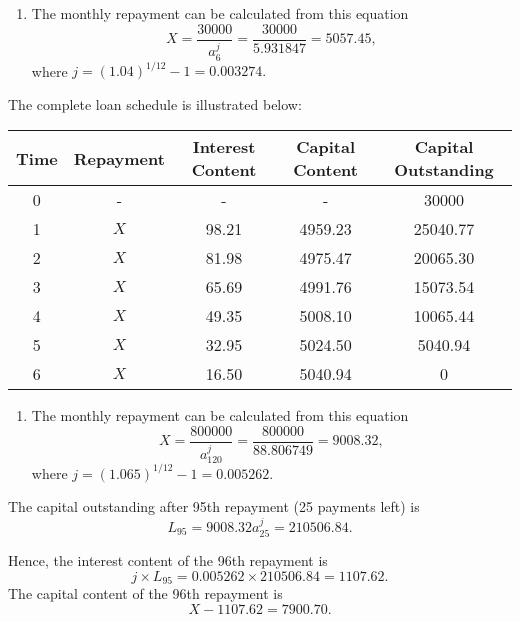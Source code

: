 \documentclass[
]{article}
\providecommand{\tightlist}{%
  \setlength{\itemsep}{0pt}\setlength{\parskip}{0pt}}
\theoremstyle{definition}
\theoremstyle{definition}
\theoremstyle{definition}
\theoremstyle{definition}
\theoremstyle{remark}
\begin{document}
\begin{enumerate}
\def\labelenumi{\arabic{enumi}.}
\tightlist
\item
  The monthly repayment can be calculated from this equation
  \[ X = \frac{30000}{a^j_6} = \frac{30000}{5.931847} = 5057.45,\]
  where \(j = (1.04)^{1/12} - 1 = 0.003274.\)
\end{enumerate}

The complete loan schedule is illustrated below:

\begin{longtable}[]{@{}ccccc@{}}
\toprule
Time & Repayment & Interest Content & Capital Content & Capital Outstanding \\
\midrule
\endhead
0 & - & - & - & 30000 \\
1 & \(X\) & 98.21 & 4959.23 & 25040.77 \\
2 & \(X\) & 81.98 & 4975.47 & 20065.30 \\
3 & \(X\) & 65.69 & 4991.76 & 15073.54 \\
4 & \(X\) & 49.35 & 5008.10 & 10065.44 \\
5 & \(X\) & 32.95 & 5024.50 & 5040.94 \\
6 & \(X\) & 16.50 & 5040.94 & 0 \\
\bottomrule
\end{longtable}

\begin{enumerate}
\def\labelenumi{\arabic{enumi}.}
\setcounter{enumi}{1}
\tightlist
\item
  The monthly repayment can be calculated from this equation
  \[ X = \frac{800000}{a^j_{120}} = \frac{800000}{88.806749} = 9008.32,\]
  where \(j = (1.065)^{1/12} - 1 = 0.005262.\)
\end{enumerate}

The capital outstanding after 95th repayment (25 payments left) is
\[ L_{95} = 9008.32 a^j_{25} = 210506.84.  \]

Hence, the interest content of the 96th repayment is
\[ j \times L_{95} = 0.005262 \times 210506.84 = 1107.62.\]
The capital content of the 96th repayment is
\[ X - 1107.62 = 7900.70. \]
\end{document}
